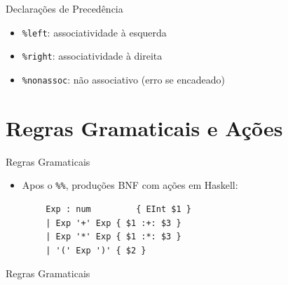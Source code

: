 \begin{frame}[fragile]{Declarações de Precedência}

    \begin{itemize}

        \item
        \texttt{\%left}: associatividade à esquerda
        \item
        \texttt{\%right}: associatividade à direita
        \item
        \texttt{\%nonassoc}: não associativo (erro se
        encadeado)
    \end{itemize}
\end{frame}


\section{Regras Gramaticais e
Ações}\label{regras-gramaticais-e-auxe7uxf5es}

\begin{frame}[fragile]{Regras Gramaticais}

    \begin{itemize}

        \item
        Apos o \texttt{\%\%}, produções BNF com ações em
        Haskell:
    \end{itemize}

    \begin{lstlisting}
        Exp : num         { EInt $1 }
        | Exp '+' Exp { $1 :+: $3 }
        | Exp '*' Exp { $1 :*: $3 }
        | '(' Exp ')' { $2 }
    \end{lstlisting}
\end{frame}

\begin{frame}[fragile]{Regras Gramaticais}

\end{frame}

